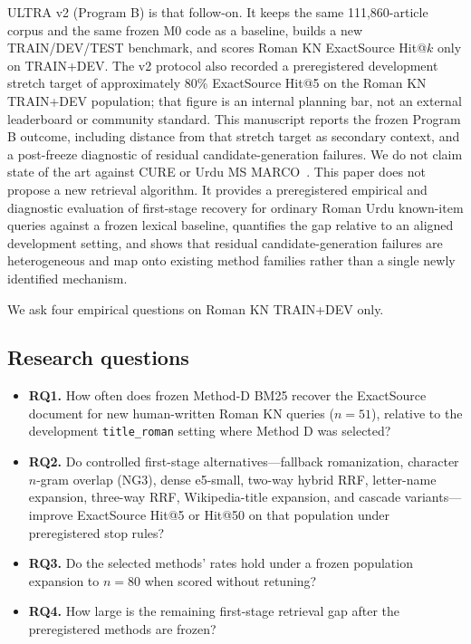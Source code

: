 \documentclass[10pt,letterpaper]{article}
\begin{document}
ULTRA v2 (Program B) is that follow-on. It keeps the same 111,860-article corpus and the same frozen M0 code as a baseline, builds a new TRAIN/DEV/TEST benchmark, and scores Roman KN ExactSource Hit@$k$ only on TRAIN+DEV. The v2 protocol also recorded a preregistered development stretch target of approximately 80\% ExactSource Hit@5 on the Roman KN TRAIN+DEV population; that figure is an internal planning bar, not an external leaderboard or community standard. This manuscript reports the frozen Program B outcome, including distance from that stretch target as secondary context, and a post-freeze diagnostic of residual candidate-generation failures. We do not claim state of the art against CURE or Urdu MS MARCO~\cite{bib5,bib6}. This paper does not propose a new retrieval algorithm. It provides a preregistered empirical and diagnostic evaluation of first-stage recovery for ordinary Roman Urdu known-item queries against a frozen lexical baseline, quantifies the gap relative to an aligned development setting, and shows that residual candidate-generation failures are heterogeneous and map onto existing method families rather than a single newly identified mechanism.

We ask four empirical questions on Roman KN TRAIN+DEV only.

\subsection*{Research questions}

\begin{itemize}
\item \textbf{RQ1.} How often does frozen Method-D BM25 recover the ExactSource document for new human-written Roman KN queries ($n = 51$), relative to the development \texttt{title\_roman} setting where Method D was selected?
\item \textbf{RQ2.} Do controlled first-stage alternatives---fallback romanization, character $n$-gram overlap (NG3), dense e5-small, two-way hybrid RRF, letter-name expansion, three-way RRF, Wikipedia-title expansion, and cascade variants---improve ExactSource Hit@5 or Hit@50 on that population under preregistered stop rules?
\item \textbf{RQ3.} Do the selected methods' rates hold under a frozen population expansion to $n = 80$ when scored without retuning?
\item \textbf{RQ4.} How large is the remaining first-stage retrieval gap after the preregistered methods are frozen?
\end{itemize}
\end{document}
